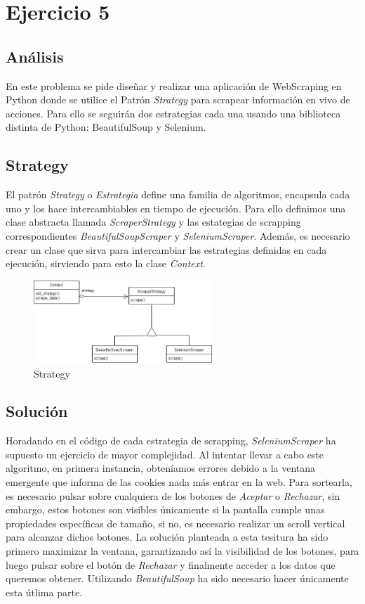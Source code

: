\documentclass{article}
\begin{document}
\newpage
\section{Ejercicio 5}
\subsection{Análisis}
En este problema se pide diseñar y realizar una aplicación de WebScraping en Python donde se utilice el Patrón \textit{Strategy} para scrapear
información en vivo de acciones.  Para ello se seguirán dos estrategias cada una usando una biblioteca distinta de Python: BeautifulSoup y Selenium.

\subsection{Strategy}
El patrón \textit{Strategy} o \textit{Estrategia} define una familia de algoritmos, encapsula cada uno y los hace intercambiables en tiempo de
ejecución. Para ello definimos una clase abstracta llamada \textit{ScraperStrategy} y las estategias de scrapping correspondientes
\textit{BeautifulSoupScraper} y \textit{SeleniumScraper}. Además, es necesario crear un clase que sirva para intercambiar las estrategias
definidas en cada ejecución, sirviendo para esto la clase \textit{Context}.

\begin{figure}[h]
	\centering
        \vspace{15pt}
	\includegraphics[width=0.6\textwidth]{DS_ej5.drawio.png}
	\caption{Strategy}
	\label{fig:strategy}
\end{figure}


\subsection{Solución}
Horadando en el código de cada estrategia de scrapping, \textit{SeleniumScraper} ha supuesto un ejercicio de mayor complejidad. Al intentar llevar a cabo este algoritmo, en primera instancia, obteníamos
errores debido a la ventana emergente que informa de las cookies nada más entrar en la web. Para sortearla, es necesario pulsar sobre cualquiera de
los botones de \textit{Aceptar} o \textit{Rechazar}, sin embargo, estos botones son visibles únicamente si la pantalla cumple unas propiedades 
específicas de tamaño, si no, es necesario realizar un scroll vertical para alcanzar dichos botones. La solución planteada a esta tesitura ha sido 
primero maximizar la ventana, garantizando así la visibilidad de los botones, para luego pulsar sobre el botón de \textit{Rechazar} y finalmente 
acceder a los datos que queremos obtener. Utilizando \textit{BeautifulSoup} ha sido necesario hacer únicamente esta útlima parte.
\end{document}
